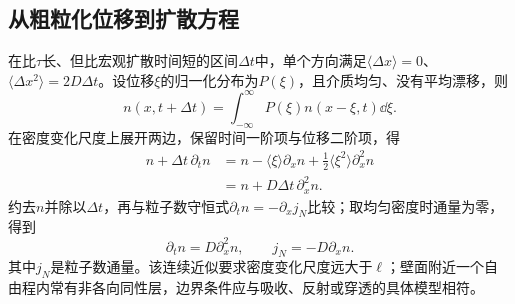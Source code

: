 \subsection{从粗粒化位移到扩散方程}
在比$\tau$长、但比宏观扩散时间短的区间$\Delta t$中，单个方向满足$\langle\Delta x\rangle=0$、$\langle\Delta x^2\rangle=2D\Delta t$。设位移$\xi$的归一化分布为$P(\xi)$，且介质均匀、没有平均漂移，则
\[
 n(x,t+\Delta t)=\int_{-\infty}^{\infty}P(\xi)n(x-\xi,t)\dd\xi.
\]
在密度变化尺度上展开两边，保留时间一阶项与位移二阶项，得
\begin{align*}
 n+\Delta t\,\partial_tn
 &=n-\langle\xi\rangle\partial_xn
   +\frac12\langle\xi^2\rangle\partial_x^2n\\
 &=n+D\Delta t\,\partial_x^2n.
\end{align*}
约去$n$并除以$\Delta t$，再与粒子数守恒式$\partial_tn=-\partial_xj_N$比较；取均匀密度时通量为零，得到
\[
 \partial_t n=D\partial_x^2n,\qquad j_N=-D\partial_xn.
\]
其中$j_N$是粒子数通量。该连续近似要求密度变化尺度远大于$\ell$；壁面附近一个自由程内常有非各向同性层，边界条件应与吸收、反射或穿透的具体模型相符。

